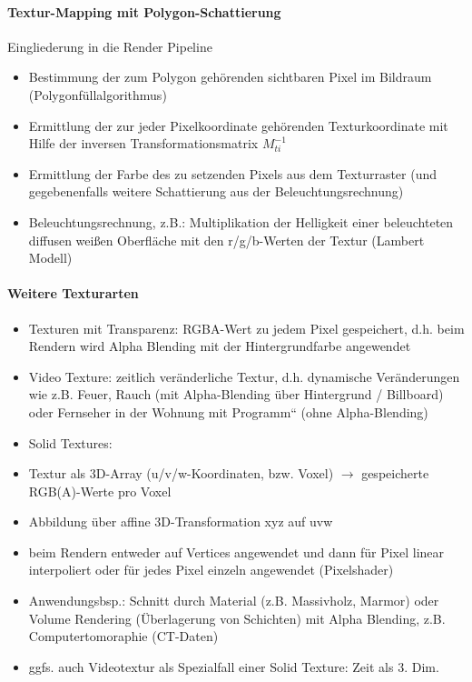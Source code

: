 \documentclass[10pt,landscape]{article}
\begin{document}
\begin{multicols}{3}
\paragraph{Textur-Mapping mit Polygon-Schattierung}
Eingliederung in die Render Pipeline
\begin{itemize}
  \item Bestimmung der zum Polygon gehörenden sichtbaren Pixel im Bildraum (Polygonfüllalgorithmus)
  \item Ermittlung der zur jeder Pixelkoordinate gehörenden Texturkoordinate mit Hilfe der inversen Transformationsmatrix $M_{ti}^{-1}$
  \item Ermittlung der Farbe des zu setzenden Pixels aus dem Texturraster (und gegebenenfalls weitere Schattierung aus der Beleuchtungsrechnung)
  \item Beleuchtungsrechnung, z.B.: Multiplikation der Helligkeit einer beleuchteten diffusen weißen Oberfläche mit den r/g/b-Werten der Textur (Lambert Modell)
\end{itemize}

\paragraph{Weitere Texturarten}
\begin{itemize}
  \item Texturen mit Transparenz: RGBA-Wert zu jedem Pixel gespeichert, d.h. beim Rendern wird Alpha Blending mit der Hintergrundfarbe angewendet
  \item Video Texture: zeitlich veränderliche Textur, d.h. dynamische Veränderungen wie z.B. Feuer, Rauch (mit Alpha-Blending über Hintergrund / Billboard) oder Fernseher in der Wohnung mit Programm“ (ohne Alpha-Blending)
  \item Solid Textures:
  \item Textur als 3D-Array (u/v/w-Koordinaten, bzw. Voxel) $\rightarrow$ gespeicherte RGB(A)-Werte pro Voxel
  \item Abbildung über affine 3D-Transformation xyz auf uvw
  \item beim Rendern entweder auf Vertices angewendet und dann für Pixel linear interpoliert oder für jedes Pixel einzeln angewendet (Pixelshader)
  \item Anwendungsbsp.: Schnitt durch Material (z.B. Massivholz, Marmor) oder Volume Rendering (Überlagerung von Schichten) mit Alpha Blending, z.B. Computertomoraphie (CT-Daten)
  \item ggfs. auch Videotextur als Spezialfall einer Solid Texture: Zeit als 3. Dim.
\end{itemize}


\end{multicols}
\end{document}

